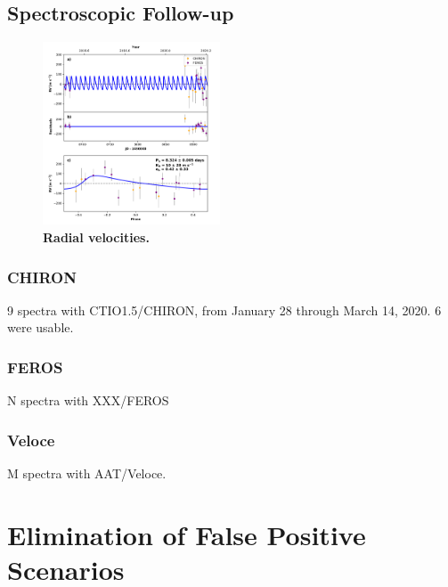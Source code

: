 \documentclass[12pt,twocolumn,tighten]{aastex62}
\begin{document}
\subsection{Spectroscopic Follow-up}
\label{subsec:spectra}

\begin{figure}[t!]
	\begin{center}
		\leavevmode
		\includegraphics[width=0.47\textwidth]{f3.pdf}
	\end{center}
	\vspace{-0.7cm}
	\caption{
		{\bf Radial velocities.}
		\label{fig:rvs}
	}
\end{figure}


\subsubsection{CHIRON}
9 spectra with CTIO1.5/CHIRON, from January 28 through March 14, 2020.
6 were usable.

\subsubsection{FEROS}
N spectra with XXX/FEROS

\subsubsection{Veloce}
M spectra with AAT/Veloce.


\section{Elimination of False Positive Scenarios}
\label{sec:validation}
\end{document}
